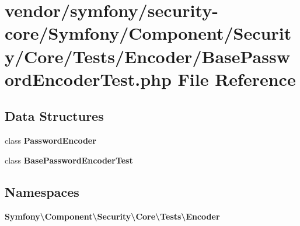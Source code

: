 \section{vendor/symfony/security-\/core/\+Symfony/\+Component/\+Security/\+Core/\+Tests/\+Encoder/\+Base\+Password\+Encoder\+Test.php File Reference}
\label{_base_password_encoder_test_8php}
\subsection*{Data Structures}
\begin{DoxyCompactItemize}
\item 
class {\bf Password\+Encoder}
\item 
class {\bf Base\+Password\+Encoder\+Test}
\end{DoxyCompactItemize}
\subsection*{Namespaces}
\begin{DoxyCompactItemize}
\item 
 {\bf Symfony\textbackslash{}\+Component\textbackslash{}\+Security\textbackslash{}\+Core\textbackslash{}\+Tests\textbackslash{}\+Encoder}
\end{DoxyCompactItemize}
